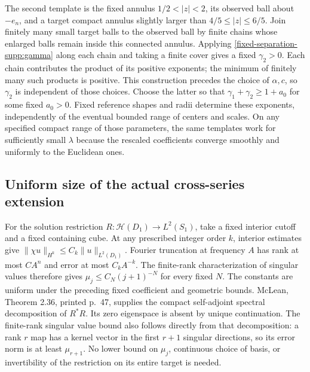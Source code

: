 \documentclass[11pt]{article}
\theoremstyle{definition}
\theoremstyle{remark}
\numberwithin{equation}{section}
\begin{document}
The second template is the fixed annulus
$1/2<|z|<2$, its observed ball about $-e_n$, and a target compact
annulus slightly larger than $4/5\le|z|\le6/5$. Join finitely many
small target balls to the observed ball by finite chains whose enlarged
balls remain inside this connected annulus. Applying
\eqref{fixed-separation-supp:gamma} along each chain and taking a
finite cover gives a fixed $\gamma_2>0$. Each chain contributes the
product of its positive exponents; the minimum of finitely many such
products is positive. This construction precedes the choice of
$\alpha,c$, so $\gamma_2$ is independent of those choices.
Choose the latter so that $\gamma_1+\gamma_2\ge1+a_0$ for some
fixed $a_0>0$. Fixed reference shapes and radii determine these
exponents, independently of the eventual bounded range of centers and
scales. On any specified compact range of those parameters, the same
templates work for sufficiently small $\lambda$ because the rescaled
coefficients converge smoothly and uniformly to the Euclidean ones.

\subsection{Uniform size of the actual cross-series extension}
\label{fixed-separation-supp:series}

For the solution restriction $R:\mathcal H(D_1)\to L^2(S_1)$, take
a fixed interior cutoff and a fixed containing cube. At any prescribed
integer order $k$, interior estimates give
$\|\chi u\|_{H^k}\le C_k\|u\|_{L^2(D_1)}$. Fourier truncation
at frequency $A$ has rank at most $C A^n$ and error at most
$C_k A^{-k}$. The finite-rank characterization of singular values
therefore gives $\mu_j\le C_N(j+1)^{-N}$ for every fixed $N$.
The constants are uniform under the preceding fixed coefficient and
geometric bounds. McLean, Theorem 2.36, printed p.~47, supplies the
compact self-adjoint spectral decomposition of $R^*R$. Its zero
eigenspace is absent by unique continuation. The finite-rank singular
value bound also follows directly from that decomposition: a rank
$r$ map has a kernel vector in the first $r+1$ singular directions,
so its error norm is at least $\mu_{r+1}$. No lower bound on $\mu_j$,
continuous choice of basis, or
invertibility of the restriction on its entire target is needed.
\end{document}
